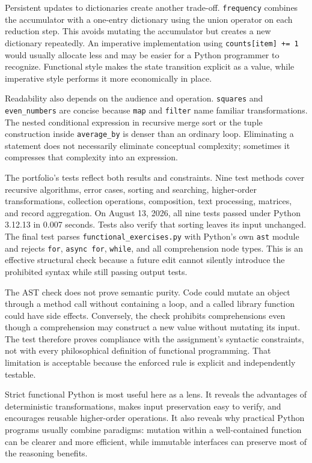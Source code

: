 \documentclass[12pt]{article}
\begin{document}
Persistent updates to dictionaries create another trade-off. \texttt{frequency} combines the accumulator with a one-entry dictionary using the union operator on each reduction step. This avoids mutating the accumulator but creates a new dictionary repeatedly. An imperative implementation using \texttt{counts[item]\ +=\ 1} would usually allocate less and may be easier for a Python programmer to recognize. Functional style makes the state transition explicit as a value, while imperative style performs it more economically in place.


Readability also depends on the audience and operation. \texttt{squares} and \texttt{even\_numbers} are concise because \texttt{map} and \texttt{filter} name familiar transformations. The nested conditional expression in recursive merge sort or the tuple construction inside \texttt{average\_by} is denser than an ordinary loop. Eliminating a statement does not necessarily eliminate conceptual complexity; sometimes it compresses that complexity into an expression.


The portfolio's tests reflect both results and constraints. Nine test methods cover recursive algorithms, error cases, sorting and searching, higher-order transformations, collection operations, composition, text processing, matrices, and record aggregation. On August 13, 2026, all nine tests passed under Python 3.12.13 in 0.007 seconds. Tests also verify that sorting leaves its input unchanged. The final test parses \texttt{functional\_exercises.py} with Python's own \texttt{ast} module and rejects \texttt{for}, \texttt{async\ for}, \texttt{while}, and all comprehension node types. This is an effective structural check because a future edit cannot silently introduce the prohibited syntax while still passing output tests.


The AST check does not prove semantic purity. Code could mutate an object through a method call without containing a loop, and a called library function could have side effects. Conversely, the check prohibits comprehensions even though a comprehension may construct a new value without mutating its input. The test therefore proves compliance with the assignment's syntactic constraints, not with every philosophical definition of functional programming. That limitation is acceptable because the enforced rule is explicit and independently testable.


Strict functional Python is most useful here as a lens. It reveals the advantages of deterministic transformations, makes input preservation easy to verify, and encourages reusable higher-order operations. It also reveals why practical Python programs usually combine paradigms: mutation within a well-contained function can be clearer and more efficient, while immutable interfaces can preserve most of the reasoning benefits.
\end{document}
